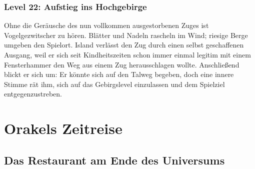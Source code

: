 \section{Level 22: Aufstieg ins Hochgebirge}

Ohne die Geräusche des nun vollkommen ausgestorbenen Zuges ist Vogelgezwitscher zu hören. Blätter und Nadeln rascheln im Wind; riesige Berge umgeben den Spielort. Island verlässt den Zug durch einen selbst geschaffenen Ausgang, weil er sich seit Kindheitszeiten schon immer einmal legitim mit einem Fensterhammer den Weg aus einem Zug herausschlagen wollte. Anschließend blickt er sich um: Er könnte sich auf den Talweg begeben, doch eine innere Stimme rät ihm, sich auf das Gebirgslevel einzulassen und dem Spielziel entgegenzustreben.






















\part{Orakels Zeitreise}














































\chapter{Das Restaurant am Ende des Universums}

